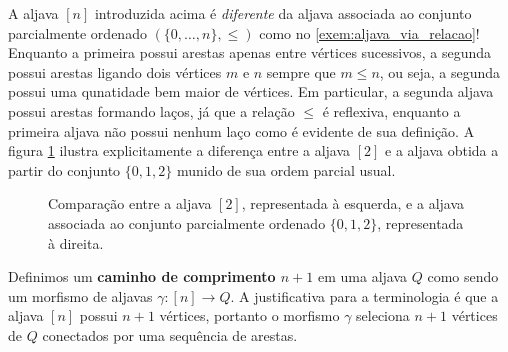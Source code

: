 \begin{obs}
    A aljava $[n]$ introduzida acima é \emph{diferente} da aljava associada ao conjunto parcialmente ordenado $(\{0,\dots,n\},\leq)$ como no \cref{exem:aljava_via_relacao}!
    Enquanto a primeira possui arestas apenas entre vértices sucessivos, a segunda possui arestas ligando dois vértices $m$ e $n$ sempre que $m \leq n$, ou seja, a segunda possui uma qunatidade bem maior de vértices.
    Em particular, a segunda aljava possui arestas formando laços, já que a relação $\leq$ é reflexiva, enquanto a primeira aljava não possui nenhum laço como é evidente de sua definição.
    A figura \cref{fig:aljava_ordinal_versus_aljava_poset} ilustra explicitamente a diferença entre a aljava $[2]$ e a aljava obtida a partir do conjunto $\{0,1,2\}$ munido de sua ordem parcial usual.
    
    \begin{figure}
        \centering
        \caption{Comparação entre a aljava $[2]$, representada à esquerda, e a aljava associada ao conjunto parcialmente ordenado $\{0,1,2\}$, representada à direita.}
        \label{fig:aljava_ordinal_versus_aljava_poset}
    \end{figure}
\end{obs}

Definimos um \textbf{caminho de comprimento $n+1$} em uma aljava $Q$ como sendo um morfismo de aljavas $\gamma: [n] \to Q$.
A justificativa para a terminologia é que a aljava $[n]$ possui $n+1$ vértices, portanto o morfismo $\gamma$ seleciona $n+1$ vértices de $Q$ conectados por uma sequência de arestas.

